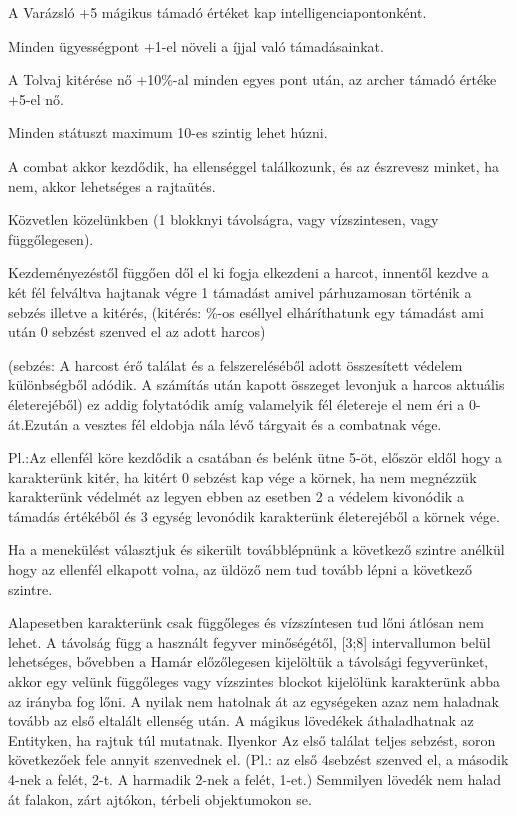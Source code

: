 \noindent A Varázsló +5 mágikus támadó értéket kap intelligenciapontonként.

\noindent Minden ügyességpont +1-el növeli a íjjal való támadásainkat.

\noindent A Tolvaj kitérése nő +10\%-al minden egyes pont után, az archer támadó értéke +5-el nő.

\noindent Minden státuszt maximum 10-es szintig lehet húzni.


A combat akkor kezdődik, ha ellenséggel találkozunk, és az észrevesz minket, ha nem, akkor lehetséges a rajtaütés.


Közvetlen közelünkben (1 blokknyi távolságra, vagy vízszintesen, vagy függőlegesen).

Kezdeményezéstől függően dől el ki fogja elkezdeni a harcot, innentől kezdve a két fél felváltva hajtanak végre 1 támadást amivel párhuzamosan történik a sebzés illetve a kitérés, (kitérés: \%-os eséllyel elháríthatunk egy támadást ami után 0 sebzést szenved el az adott harcos)

(sebzés: A harcost érő találat és a felszereléséből adott összesített védelem különbségből adódik. A számítás után kapott összeget levonjuk a harcos aktuális életerejéből) ez addig folytatódik amíg valamelyik fél életereje el nem éri a 0-át.Ezután a vesztes fél eldobja nála lévő tárgyait és a combatnak vége.


Pl.:Az ellenfél köre kezdődik a csatában és belénk ütne 5-öt, először eldől hogy a karakterünk kitér, ha kitért 0 sebzést kap vége a körnek, ha nem megnézzük karakterünk védelmét az legyen ebben az esetben 2 a védelem kivonódik a támadás értékéből és 3 egység levonódik karakterünk életerejéből a körnek vége.

Ha a menekülést választjuk és sikerült továbblépnünk a következő szintre anélkül hogy az ellenfél elkapott volna, az üldöző nem tud tovább lépni a következő szintre.


Alapesetben karakterünk csak függőleges és vízszíntesen tud lőni átlósan nem lehet. A távolság függ a használt fegyver minőségétől, [3;8] intervallumon belül lehetséges, bővebben a %
Hamár előzőlegesen kijelöltük a távolsági fegyverünket, akkor egy velünk függőleges vagy vízszintes blockot kijelölünk karakterünk abba az irányba fog lőni.
A nyilak nem hatolnak át az egységeken azaz nem haladnak tovább az első eltalált ellenség után.
A mágikus lövedékek áthaladhatnak az Entityken, ha rajtuk túl mutatnak. Ilyenkor Az első találat teljes sebzést, soron következőek fele annyit szenvednek el. (Pl.: az első 4sebzést szenved el, a második 4-nek a felét, 2-t. A harmadik 2-nek a felét, 1-et.)
Semmilyen lövedék nem halad át falakon, zárt ajtókon, térbeli objektumokon se.

